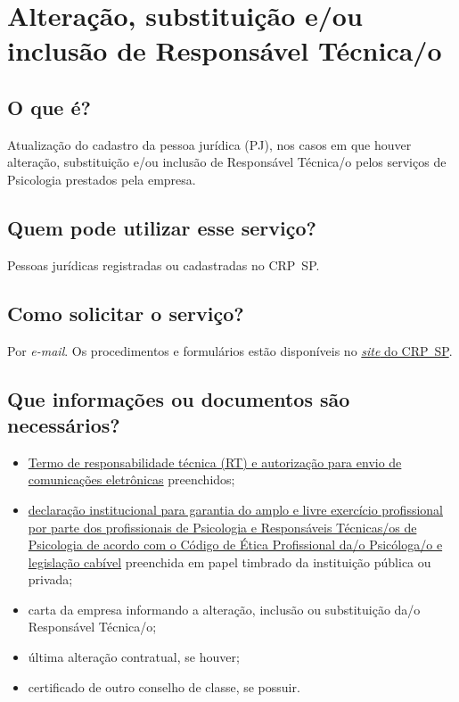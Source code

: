 \chapter{Alteração, substituição e/ou inclusão de Responsável Técnica/o}
\label{chap:pj-rt}

\section{O que é?}

Atualização do cadastro da pessoa jurídica (PJ), nos casos em que houver alteração, substituição e/ou inclusão de Responsável Técnica/o pelos serviços de Psicologia prestados pela empresa.

\section{Quem pode utilizar esse serviço?}

Pessoas jurídicas registradas ou cadastradas no CRP~SP.

\section{Como solicitar o serviço?}

Por \emph{e-mail}. Os procedimentos e formulários estão disponíveis no \href{https://www.crpsp.org/pagina/view/322}{\emph{site} do CRP~SP}.

\section{Que informações ou documentos são necessários?}

\begin{itemize}
  \item  \hyperref[]{Termo  de responsabilidade técnica (RT) e autorização para envio de  comunicações eletrônicas} preenchidos;
  \item  \hyperref[]{declaração  institucional para garantia do amplo e livre exercício profissional  por parte dos profissionais de Psicologia e Responsáveis Técnicas/os de  Psicologia de acordo com o Código de Ética Profissional da/o  Psicóloga/o e legislação cabível} preenchida em papel timbrado da  instituição pública ou privada;
  \item  carta da empresa informando a alteração, inclusão ou substituição da/o  Responsável Técnica/o;
  \item  última alteração contratual, se houver;
  \item  certificado de outro conselho de classe, se possuir.
\end{itemize}

